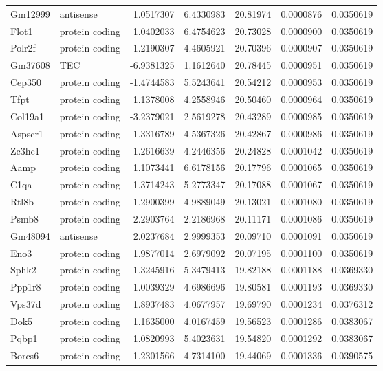 \documentclass[onehalf,12pt]{beavtex}
\begin{document}
\begin{longtable}{llrrrrr}
  Gm12999 & antisense & 1.0517307 & 6.4330983 & 20.81974 & 0.0000876 & 0.0350619\\
  Flot1 & protein coding & 1.0402033 & 6.4754623 & 20.73028 & 0.0000900 & 0.0350619\\
  Polr2f & protein coding & 1.2190307 & 4.4605921 & 20.70396 & 0.0000907 & 0.0350619\\
  Gm37608 & TEC & -6.9381325 & 1.1612640 & 20.78445 & 0.0000951 & 0.0350619\\
  \addlinespace
  Cep350 & protein coding & -1.4744583 & 5.5243641 & 20.54212 & 0.0000953 & 0.0350619\\
  Tfpt & protein coding & 1.1378008 & 4.2558946 & 20.50460 & 0.0000964 & 0.0350619\\
  Col19a1 & protein coding & -3.2379021 & 2.5619278 & 20.43289 & 0.0000985 & 0.0350619\\
  Aspscr1 & protein coding & 1.3316789 & 4.5367326 & 20.42867 & 0.0000986 & 0.0350619\\
  Zc3hc1 & protein coding & 1.2616639 & 4.2446356 & 20.24828 & 0.0001042 & 0.0350619\\
  \addlinespace
  Aamp & protein coding & 1.1073441 & 6.6178156 & 20.17796 & 0.0001065 & 0.0350619\\
  C1qa & protein coding & 1.3714243 & 5.2773347 & 20.17088 & 0.0001067 & 0.0350619\\
  Rtl8b & protein coding & 1.2900399 & 4.9889049 & 20.13021 & 0.0001080 & 0.0350619\\
  Psmb8 & protein coding & 2.2903764 & 2.2186968 & 20.11171 & 0.0001086 & 0.0350619\\
  Gm48094 & antisense & 2.0237684 & 2.9999353 & 20.09710 & 0.0001091 & 0.0350619\\
  \addlinespace
  Eno3 & protein coding & 1.9877014 & 2.6979092 & 20.07195 & 0.0001100 & 0.0350619\\
  Sphk2 & protein coding & 1.3245916 & 5.3479413 & 19.82188 & 0.0001188 & 0.0369330\\
  Ppp1r8 & protein coding & 1.0039329 & 4.6986696 & 19.80581 & 0.0001193 & 0.0369330\\
  Vps37d & protein coding & 1.8937483 & 4.0677957 & 19.69790 & 0.0001234 & 0.0376312\\
  Dok5 & protein coding & 1.1635000 & 4.0167459 & 19.56523 & 0.0001286 & 0.0383067\\
  \addlinespace
  Pqbp1 & protein coding & 1.0820993 & 5.4023631 & 19.54820 & 0.0001292 & 0.0383067\\
  Borcs6 & protein coding & 1.2301566 & 4.7314100 & 19.44069 & 0.0001336 & 0.0390575\\

\end{longtable}
\end{document}
